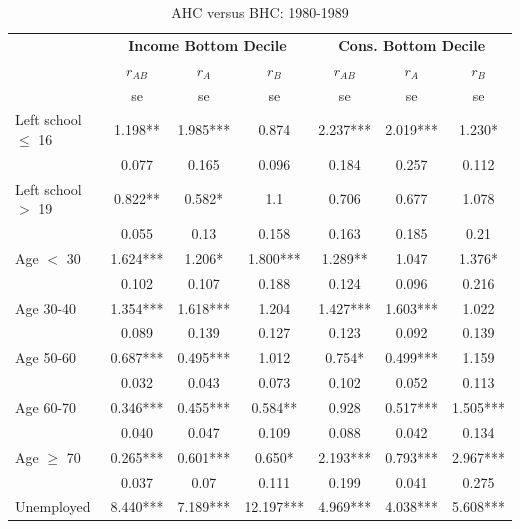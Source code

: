 \begin{table}
\caption{AHC versus BHC: 1980-1989}
\centering
\begin{tabular}{l|ccc|ccc}
\hline\hline 
	& \multicolumn{3}{c}{\textbf{Income Bottom Decile}} &  \multicolumn{3}{c}{\textbf{Cons. Bottom Decile}} \\
	&	$r_{AB}$	&	$r_{A}$	&	$r_{B}$	&	$r_{AB}$	&	$r_{A}$	&	$r_{B}$	\\
  & se & se & se  & se & se & se \\
\hline
Left school $\leq$ 16	&	       1.198** 	&	       1.985***	&	0.874	&	       2.237***	&	       2.019***	&	       1.230*  	\\
                    	&	       0.077   	&	0.165	&	0.096	&	       0.184   	&	0.257	&	0.112	\\
Left school $>$ 19	&	       0.822** 	&	       0.582*  	&	1.1	&	       0.706   	&	0.677	&	1.078	\\
                    	&	       0.055   	&	0.13	&	0.158	&	       0.163   	&	0.185	&	0.21	\\
Age $<$ 30	&	       1.624***	&	       1.206*  	&	       1.800***	&	       1.289** 	&	1.047	&	       1.376*  	\\
                    	&	       0.102   	&	0.107	&	0.188	&	       0.124   	&	0.096	&	0.216	\\
Age 30-40	&	       1.354***	&	       1.618***	&	1.204	&	       1.427***	&	       1.603***	&	1.022	\\
                    	&	       0.089   	&	0.139	&	0.127	&	       0.123   	&	0.092	&	0.139	\\
Age 50-60	&	       0.687***	&	       0.495***	&	1.012	&	       0.754*  	&	       0.499***	&	1.159	\\
                    	&	       0.032   	&	0.043	&	0.073	&	       0.102   	&	0.052	&	0.113	\\
Age 60-70	&	       0.346***	&	       0.455***	&	       0.584** 	&	       0.928   	&	       0.517***	&	       1.505***	\\
                    	&	       0.040   	&	0.047	&	0.109	&	       0.088   	&	0.042	&	0.134	\\
Age $\geq$ 70	&	       0.265***	&	       0.601***	&	       0.650*  	&	       2.193***	&	       0.793***	&	       2.967***	\\
                    	&	       0.037   	&	0.07	&	0.111	&	       0.199   	&	0.041	&	0.275	\\
Unemployed	&	       8.440***	&	       7.189***	&	      12.197***	&	       4.969***	&	       4.038***	&	       5.608***	\\

\end{tabular}
\end{table}
